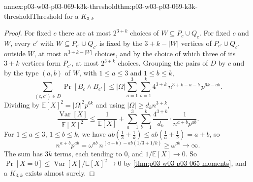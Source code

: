 \begin{annexitem}{annex:p03-w03-p03-069-k3k-threshold}{thm:p03-w03-p03-069-k3k-threshold}{Threshold for a \(K_{3,k}\)}
\begin{proof}
For fixed \(c\) there are at most \(2^{3+k}\) choices of \(W\subseteq
P_c\cup Q_c\).  For fixed \(c\) and \(W\), every \(c'\) with
\(W\subseteq P_{c'}\cup Q_{c'}\) is fixed by the \(3+k-|W|\) vertices of
\(P_{c'}\cup Q_{c'}\) outside \(W\), at most \(n^{3+k-|W|}\) choices, and by
the choice of which three of its \(3+k\) vertices form \(P_{c'}\), at most
\(2^{3+k}\) choices.  Grouping the pairs of \(D\) by \(c\) and by the type
\((a,b)\) of \(W\), with \(1\leq a\leq3\) and \(1\leq b\leq k\),
\[
  \sum_{(c,c')\in D}\Pr[B_c\wedge B_{c'}]
  \leq|\Omega|\sum_{a=1}^{3}\sum_{b=1}^{k}4^{3+k}\,n^{3+k-a-b}\,p^{6k-ab}.
\]
Dividing by \(\mathbb E[X]^2=|\Omega|^2p^{6k}\) and using
\(|\Omega|\geq d_kn^{3+k}\),
\[
  \frac{\operatorname{Var}[X]}{\mathbb E[X]^2}
  \leq\frac1{\mathbb E[X]}
  +\sum_{a=1}^{3}\sum_{b=1}^{k}\frac{4^{3+k}}{d_k}\cdot
  \frac{1}{n^{a+b}p^{ab}} .
\]
For \(1\leq a\leq3\), \(1\leq b\leq k\), we have
\(ab(\tfrac13+\tfrac1k)\leq ab(\tfrac1a+\tfrac1b)=a+b\), so
\[
  n^{a+b}p^{ab}=\omega^{ab}\,n^{(a+b)-ab(1/3+1/k)}\geq\omega^{ab}\to\infty .
\]
The sum has \(3k\) terms, each tending to \(0\), and
\(1/\mathbb E[X]\to0\).  So \(\Pr[X=0]\leq\operatorname{Var}[X]/\mathbb
E[X]^2\to0\) by \cref{thm:p03-w03-p03-065-moments}, and a \(K_{3,k}\) exists
almost surely.
\end{proof}
\end{annexitem}

